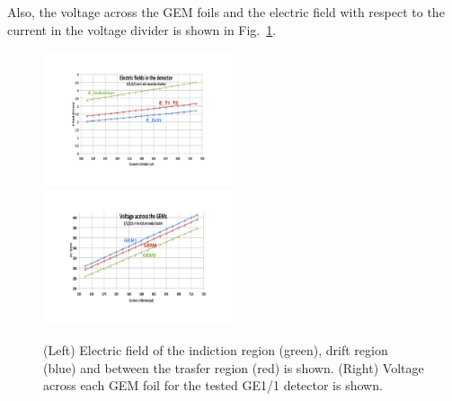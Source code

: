Also, the voltage across the GEM foils and  the electric field  with respect to the current in the voltage divider is shown in Fig.~\ref{fig:GEM_voltage_electricfield}. 
\begin{figure}[!htbp]
    \centering
    \includegraphics[width=0.5\textwidth]{figures/GEM/GE11_IV_ElectricField_detector_2.pdf}%
    \includegraphics[width=0.5\textwidth]{figures/GEM/GE11_IV_VoltageAcross_GEM_2.pdf}
    \caption{(Left) Electric field of the indiction region (green), drift region (blue) and between the trasfer region (red) is shown. (Right) Voltage across each GEM foil for the tested GE1/1 detector is shown.}
    \label{fig:GEM_voltage_electricfield}
\end{figure}

